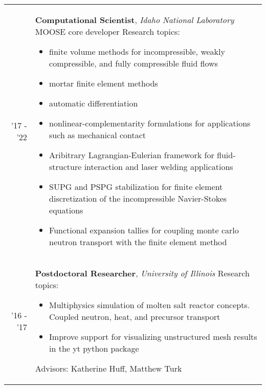 \documentclass[a4paper,10pt]{article} %
\begin{document}
\begin{table}[H]
  \begin{tabularx}{\textwidth}{r>{\raggedright\arraybackslash}X}

    \textsc{'17 - '22} & \textbf{Computational Scientist}, \textit{Idaho National Laboratory}\newline
    MOOSE core developer\newline
    Research topics:
    \begin{itemize}
    \item finite volume methods for incompressible, weakly compressible, and
      fully compressible fluid flows
    \item mortar finite element methods
    \item automatic differentiation
    \item nonlinear-complementarity formulations for applications such as mechanical contact
    \item Aribitrary Lagrangian-Eulerian framework for fluid-structure interaction and laser welding applications
    \item SUPG and PSPG stabilization for finite element discretization of the incompressible Navier-Stokes
      equations
    \item Functional expansion tallies for coupling monte carlo neutron
      transport with the finite element method
    \end{itemize}\\

    \textsc{'16 - '17} & \textbf{Postdoctoral Researcher}, \textit{University of Illinois} \newline
    Research topics:
    \begin{itemize}
    \item Multiphysics simulation of molten salt reactor concepts. Coupled neutron, heat, and precursor transport
    \item Improve support for visualizing unstructured mesh results in the yt python package
    \end{itemize}
    Advisors: Katherine Huff, Matthew Turk\\

  \end{tabularx}
\end{table}

\end{document}
